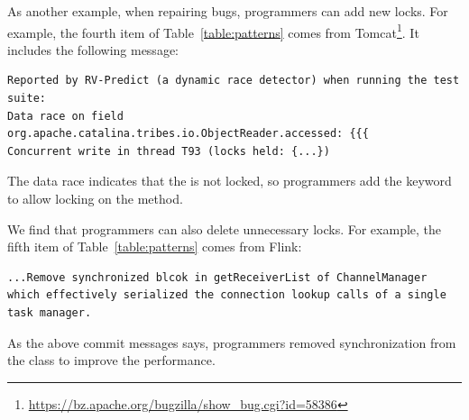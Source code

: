 As another example, when repairing bugs, programmers can add new locks. For example, the fourth item of Table~\ref{table:patterns} comes from Tomcat\footnote{\url{https://bz.apache.org/bugzilla/show\_bug.cgi?id=58386}}. It includes the following message:

\begin{lstlisting}
Reported by RV-Predict (a dynamic race detector) when running the test suite:
Data race on field org.apache.catalina.tribes.io.ObjectReader.accessed: {{{
Concurrent write in thread T93 (locks held: {...})
\end{lstlisting}

The data race indicates that the  is not locked, so programmers add the  keyword to allow locking on the method.


We find that programmers can also delete unnecessary locks. For example, the fifth item of Table~\ref{table:patterns} comes from Flink:

\begin{lstlisting}
...Remove synchronized blcok in getReceiverList of ChannelManager which effectively serialized the connection lookup calls of a single task manager.
\end{lstlisting}

As the above commit messages says, programmers removed synchronization from the  class to improve the performance.








